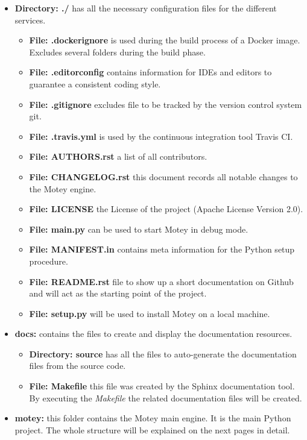 \begin{itemize}
  \item{\textbf{Directory: ./}} has all the necessary configuration files for the different services.
  \begin{itemize}
    \item{\textbf{File: .dockerignore}} is used during the build process of a Docker image. Excludes several folders during the build phase.
    \item{\textbf{File: .editorconfig}} contains information for \acp{IDE} and editors to guarantee a consistent coding style.
    \item{\textbf{File: .gitignore}} excludes file to be tracked by the version control system git.
    \item{\textbf{File: .travis.yml}} is used by the continuous integration tool Travis CI.
    \item{\textbf{File: AUTHORS.rst}} a list of all contributors.
    \item{\textbf{File: CHANGELOG.rst}} this document records all notable changes to the Motey engine.
    \item{\textbf{File: LICENSE}} the License of the project (Apache License Version 2.0).
    \item{\textbf{File: main.py}} can be used to start Motey in debug mode.
    \item{\textbf{File: MANIFEST.in}} contains meta information for the Python setup procedure.
    \item{\textbf{File: README.rst}} file to show up a short documentation on Github and will act as the starting point of the project.
    \item{\textbf{File: setup.py}} will be used to install Motey on a local machine.
  \end{itemize}
  \item{\textbf{docs:}} contains the files to create and display the documentation resources.
  \begin{itemize}
    \item{\textbf{Directory: source}} has all the files to auto-generate the documentation files from the source code.
    \item{\textbf{File: Makefile}} this file was created by the Sphinx documentation tool. By executing the \textit{Makefile} the related documentation files will be created.
  \end{itemize}
  \item{\textbf{motey:}} this folder contains the Motey main engine. It is the main Python project. The whole structure will be explained on the next pages in detail.

\end{itemize}
